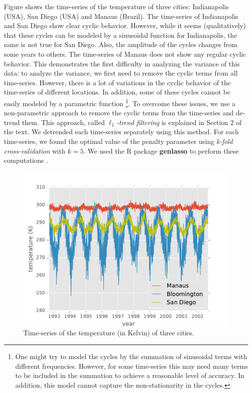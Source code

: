 \documentclass[letterpaper]{article} %
\newcommand{\autoref}{\Cref}
\begin{document}
Figure \autoref{fig:cities_ts} shows the time-series of the
temperature of three cities: Indianapolis (USA), San Diego (USA) and
Manaus (Brazil). The time-series of Indianapolis and San Diego show
clear cyclic behavior. However, while it seems (qualitatively) that
these cycles can be modeled by a sinusoidal function for Indianapolis,
the same is not true for San Diego. Also, the amplitude of the cycles
changes from some years to others. The time-series of Manaus does not
show any regular cyclic behavior. This demonstrates the first
difficulty in analyzing the variance of this data: to analyze the
variance, we first need to remove the cyclic terms from all
time-series. However, there is a lot of variations in the cyclic
behavior of the time-series of different locations. In addition, some
of these cycles cannot be easily modeled by a parametric function
\footnote{One might try to model the cycles by the summation of
  sinusoidal terms with different frequencies. However, for some
  time-series this may need many terms to be included in the summation
  to achieve a reasonable level of accuracy. In addition, this model
  cannot capture the non-stationarity in the cycles.}. To overcome
these issues, we use a non-parametric approach to remove the cyclic
terms from the time-series and de-trend them. This approach, called
\textit{$\ell_1$-trend filtering} is explained in Section 2 of the
text. We detrended each time-series separately using this method. For
each time-series, we found the optimal value of the penalty parameter
using \textit{k-fold cross-validation} with $k=5$. We used the R
package \textbf{genlasso} to perform these computations
\cite{arnold_efficient_2016}.  


\begin{figure}[tb]
	\centering
	\includegraphics[width=.2\textheight]{Figures/cities_ts}
 	\caption{Time-series of the temperature (in Kelvin) of three cities.}
 	\label{fig:cities_ts}
\end{figure} 
\end{document}
